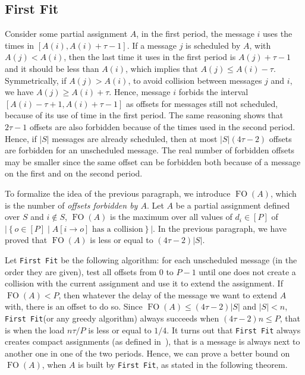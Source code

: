 \documentclass[a4paper,UKenglish,cleveref, autoref, thm-restate]{lipics-v2019}
\DeclareMathOperator{\Fo}{FO}
\newcommand\firstfit{\texttt{First Fit}\xspace}
\begin{document}
\subsection{First Fit}

Consider some partial assignment $A$, in the first period, the message $i$ uses the times in $[A(i), A(i) + \tau -1]$. If a message $j$ is scheduled by $A$, with $A(j) < A(i)$, then the last time it uses in the first period is $A(j)+\tau-1$ and it should be less than $A(i)$, which implies that $A(j) \leq A(i) - \tau$. Symmetrically, if $A(j) > A(i)$, to avoid collision between messages $j$ and $i$, we have $A(j) \geq A(i) + \tau$. Hence, message $i$ forbids the interval $[A(i) - \tau +1, A(i) + \tau -1]$ as offsets for messages still not scheduled, because of its use of time in the first period. The same reasoning shows that $2\tau -1$ offsets are also forbidden because of the times used in the second period. Hence, if $|S|$ messages are already scheduled, then at most $|S|(4\tau -2)$ offsets are forbidden for an unscheduled message. The real number of forbidden offsets may be smaller since the same offset can be forbidden both because of a message on the first and on the second period.

To formalize the idea of the previous paragraph, we introduce $\Fo(A)$, which is the number of \emph{offsets forbidden by $A$}. Let $A$ be a partial assignment defined over $S$ and $i\notin S$, $\Fo(A)$ is the maximum over all values of $d_i \in [P]$ of $|\left\{ o \in [P] \mid A[i \rightarrow o] \text{ has a collision}\right\}|$. In the previous paragraph, we have proved that $\Fo(A)$ is less or equal to $(4 \tau -2)|S|$. 

Let \firstfit be the following algorithm:  for each unscheduled message (in the order they are given), test all offsets from $0$ to $P-1$ until one does not create a collision with the current assignment and use it to extend the assignment. If $\Fo(A) < P$, then whatever the delay of the message we want to extend $A$ with, there is an offset to do so. Since $\Fo(A) \leq (4 \tau -2)|S|$ and $|S| < n$, \firstfit (or any greedy algorithm) always succeeds when $(4 \tau -2)n \leq P$, that is when the load $ n\tau /P$ is less or equal to $1/4$.
It turns out that \firstfit always creates compact assignments (as defined in~\cite{bartharxiv2018deterministic}), that is a message is always next to another one in one of the two periods. Hence, we can prove a better bound on $\Fo(A)$, when $A$ is built by \firstfit, as stated in the following theorem.
\end{document}
